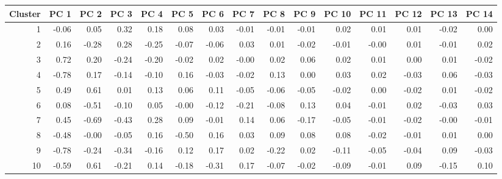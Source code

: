 \begin{tabular}{rrrrrrrrrrrrrrr}
\toprule
Cluster & PC 1 & PC 2 & PC 3 & PC 4 & PC 5 & PC 6 & PC 7 & PC 8 & PC 9 & PC 10 & PC 11 & PC 12 & PC 13 & PC 14 \\
\midrule
1 & -0.06 & 0.05 & 0.32 & 0.18 & 0.08 & 0.03 & -0.01 & -0.01 & -0.01 & 0.02 & 0.01 & 0.01 & -0.02 & 0.00 \\
2 & 0.16 & -0.28 & 0.28 & -0.25 & -0.07 & -0.06 & 0.03 & 0.01 & -0.02 & -0.01 & -0.00 & 0.01 & -0.01 & 0.02 \\
3 & 0.72 & 0.20 & -0.24 & -0.20 & -0.02 & 0.02 & -0.00 & 0.02 & 0.06 & 0.02 & 0.01 & 0.00 & 0.01 & -0.02 \\
4 & -0.78 & 0.17 & -0.14 & -0.10 & 0.16 & -0.03 & -0.02 & 0.13 & 0.00 & 0.03 & 0.02 & -0.03 & 0.06 & -0.03 \\
5 & 0.49 & 0.61 & 0.01 & 0.13 & 0.06 & 0.11 & -0.05 & -0.06 & -0.05 & -0.02 & 0.00 & -0.02 & 0.01 & -0.02 \\
6 & 0.08 & -0.51 & -0.10 & 0.05 & -0.00 & -0.12 & -0.21 & -0.08 & 0.13 & 0.04 & -0.01 & 0.02 & -0.03 & 0.03 \\
7 & 0.45 & -0.69 & -0.43 & 0.28 & 0.09 & -0.01 & 0.14 & 0.06 & -0.17 & -0.05 & -0.01 & -0.02 & -0.00 & -0.01 \\
8 & -0.48 & -0.00 & -0.05 & 0.16 & -0.50 & 0.16 & 0.03 & 0.09 & 0.08 & 0.08 & -0.02 & -0.01 & 0.01 & 0.00 \\
9 & -0.78 & -0.24 & -0.34 & -0.16 & 0.12 & 0.17 & 0.02 & -0.22 & 0.02 & -0.11 & -0.05 & -0.04 & 0.09 & -0.03 \\
10 & -0.59 & 0.61 & -0.21 & 0.14 & -0.18 & -0.31 & 0.17 & -0.07 & -0.02 & -0.09 & -0.01 & 0.09 & -0.15 & 0.10 \\
\bottomrule
\end{tabular}
